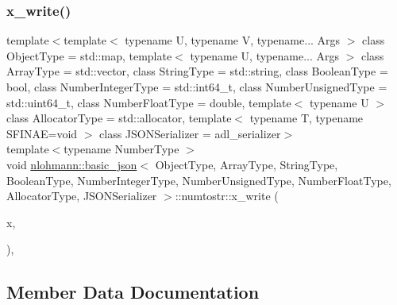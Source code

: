 \subsubsection{\texorpdfstring{x\+\_\+write()}{x\_write()}\hspace{0.1cm}{\footnotesize\ttfamily [2/2]}}
{\footnotesize\ttfamily template$<$template$<$ typename U, typename V, typename... Args $>$ class Object\+Type = std\+::map, template$<$ typename U, typename... Args $>$ class Array\+Type = std\+::vector, class String\+Type  = std\+::string, class Boolean\+Type  = bool, class Number\+Integer\+Type  = std\+::int64\+\_\+t, class Number\+Unsigned\+Type  = std\+::uint64\+\_\+t, class Number\+Float\+Type  = double, template$<$ typename U $>$ class Allocator\+Type = std\+::allocator, template$<$ typename T, typename S\+F\+I\+N\+A\+E=void $>$ class J\+S\+O\+N\+Serializer = adl\+\_\+serializer$>$ \\
template$<$typename Number\+Type $>$ \\
void \hyperlink{classnlohmann_1_1basic__json}{nlohmann\+::basic\+\_\+json}$<$ Object\+Type, Array\+Type, String\+Type, Boolean\+Type, Number\+Integer\+Type, Number\+Unsigned\+Type, Number\+Float\+Type, Allocator\+Type, J\+S\+O\+N\+Serializer $>$\+::numtostr\+::x\+\_\+write (\begin{DoxyParamCaption}\item[{Number\+Type}]{x,  }\item[{std\+::false\+\_\+type}]{ }\end{DoxyParamCaption})\hspace{0.3cm}{\ttfamily [inline]}, {\ttfamily [private]}}



\subsection{Member Data Documentation}
\mbox{\label{structnlohmann_1_1basic__json_1_1numtostr_afc0e65fa9ade391900fdc658fa1c65ab}} 
